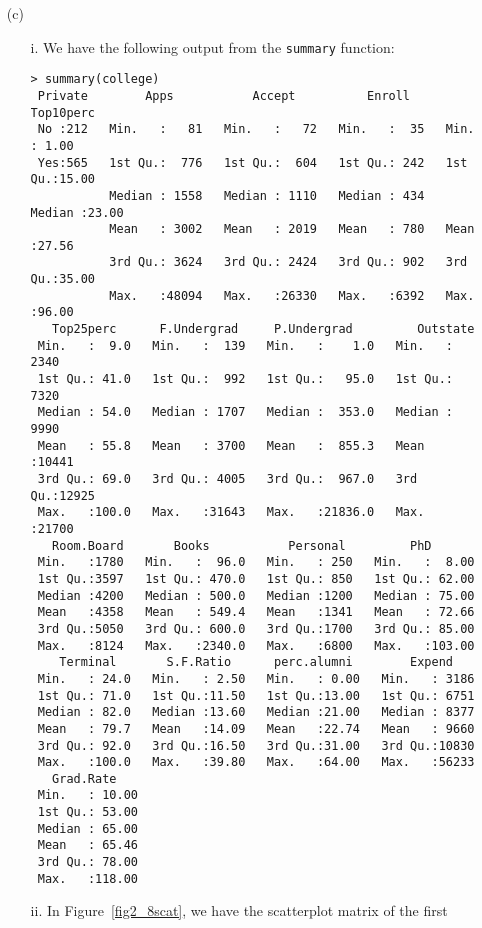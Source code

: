 
\begin{itemize}
    \item[(c)]
    \begin{itemize}
        \item[i.] We have the following output from the \verb|summary| function:
        \scriptsize\begin{verbatim}
> summary(college)
 Private        Apps           Accept          Enroll       Top10perc    
 No :212   Min.   :   81   Min.   :   72   Min.   :  35   Min.   : 1.00  
 Yes:565   1st Qu.:  776   1st Qu.:  604   1st Qu.: 242   1st Qu.:15.00  
           Median : 1558   Median : 1110   Median : 434   Median :23.00  
           Mean   : 3002   Mean   : 2019   Mean   : 780   Mean   :27.56  
           3rd Qu.: 3624   3rd Qu.: 2424   3rd Qu.: 902   3rd Qu.:35.00  
           Max.   :48094   Max.   :26330   Max.   :6392   Max.   :96.00  
   Top25perc      F.Undergrad     P.Undergrad         Outstate    
 Min.   :  9.0   Min.   :  139   Min.   :    1.0   Min.   : 2340  
 1st Qu.: 41.0   1st Qu.:  992   1st Qu.:   95.0   1st Qu.: 7320  
 Median : 54.0   Median : 1707   Median :  353.0   Median : 9990  
 Mean   : 55.8   Mean   : 3700   Mean   :  855.3   Mean   :10441  
 3rd Qu.: 69.0   3rd Qu.: 4005   3rd Qu.:  967.0   3rd Qu.:12925  
 Max.   :100.0   Max.   :31643   Max.   :21836.0   Max.   :21700  
   Room.Board       Books           Personal         PhD        
 Min.   :1780   Min.   :  96.0   Min.   : 250   Min.   :  8.00  
 1st Qu.:3597   1st Qu.: 470.0   1st Qu.: 850   1st Qu.: 62.00  
 Median :4200   Median : 500.0   Median :1200   Median : 75.00  
 Mean   :4358   Mean   : 549.4   Mean   :1341   Mean   : 72.66  
 3rd Qu.:5050   3rd Qu.: 600.0   3rd Qu.:1700   3rd Qu.: 85.00  
 Max.   :8124   Max.   :2340.0   Max.   :6800   Max.   :103.00  
    Terminal       S.F.Ratio      perc.alumni        Expend     
 Min.   : 24.0   Min.   : 2.50   Min.   : 0.00   Min.   : 3186  
 1st Qu.: 71.0   1st Qu.:11.50   1st Qu.:13.00   1st Qu.: 6751  
 Median : 82.0   Median :13.60   Median :21.00   Median : 8377  
 Mean   : 79.7   Mean   :14.09   Mean   :22.74   Mean   : 9660  
 3rd Qu.: 92.0   3rd Qu.:16.50   3rd Qu.:31.00   3rd Qu.:10830  
 Max.   :100.0   Max.   :39.80   Max.   :64.00   Max.   :56233  
   Grad.Rate     
 Min.   : 10.00  
 1st Qu.: 53.00  
 Median : 65.00  
 Mean   : 65.46  
 3rd Qu.: 78.00  
 Max.   :118.00 
        \end{verbatim}\normalsize
        \item[ii.] In Figure~\ref{fig2_8scat}, we have the scatterplot matrix of the first 

\end{itemize}
\end{itemize}

